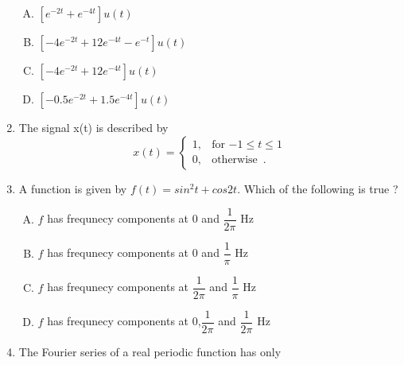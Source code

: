 \documentclass[journal,12pt,twocolumn]{IEEEtran}
\begin{document}
\begin{enumerate}[1.]
\begin{enumerate}[(A)]
\setlength\itemsep{1.5em}

\item $[e^{-2t}+e^{-4t}]u(t)$
\item $[-4e^{-2t}+12 e^{-4t}-e^{-t}]u(t)$
\item $[-4e^{-2t}+12e^{-4t}]u(t)$
\item $[-0.5e^{-2t}+1.5e^{-4t}]u(t)$

\end{enumerate}


\item The signal x(t) is described by
\[
	x(t)=\begin{cases}
		1, & \text{for $-1\leq t \leq 1$}  \\
		0, & \text{otherwise }\,.
	\end{cases}
\]
\begin{enumerate}[(A)]
\end{enumerate}



\item A function is given by $f(t)=sin^{2}t+cos2t.$ Which of the following is true ?

\begin{enumerate}[(A)]

\setlength\itemsep{1em}

\item $f$ has frequnecy components at 0 and $\dfrac{1}{2\pi}$ Hz
\item $f$ has frequnecy components at 0 and $\dfrac{1}{\pi}$ Hz
\item $f$ has frequnecy components at $\dfrac{1}{2\pi}$ and $\dfrac{1}{\pi}$ Hz
\item $f$ has frequnecy components at 0,$\dfrac{1}{2\pi}$ and $\dfrac{1}{2\pi}$ Hz


\end{enumerate}
\item The Fourier series of a real periodic function has only

\begin{enumerate}[(P)]
\setlength\itemsep{1em}


\end{enumerate}
\end{enumerate}
\end{document}
